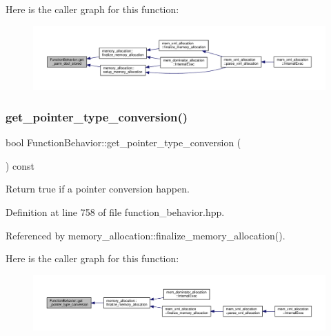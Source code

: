 Here is the caller graph for this function\+:
\nopagebreak
\begin{figure}[H]
\begin{center}
\leavevmode
\includegraphics[width=350pt]{d9/d45/classFunctionBehavior_add32fdf1e32aab5388fb8326ec0d7916_icgraph}
\end{center}
\end{figure}
\mbox{\label{classFunctionBehavior_a4fc3689f912d7f75f7c1340b8338249b}} 
\subsubsection{\texorpdfstring{get\+\_\+pointer\+\_\+type\+\_\+conversion()}{get\_pointer\_type\_conversion()}}
{\footnotesize\ttfamily bool Function\+Behavior\+::get\+\_\+pointer\+\_\+type\+\_\+conversion (\begin{DoxyParamCaption}{ }\end{DoxyParamCaption}) const\hspace{0.3cm}{\ttfamily [inline]}}



Return true if a pointer conversion happen. 



Definition at line 758 of file function\+\_\+behavior.\+hpp.



Referenced by memory\+\_\+allocation\+::finalize\+\_\+memory\+\_\+allocation().

Here is the caller graph for this function\+:
\nopagebreak
\begin{figure}[H]
\begin{center}
\leavevmode
\includegraphics[width=350pt]{d9/d45/classFunctionBehavior_a4fc3689f912d7f75f7c1340b8338249b_icgraph}
\end{center}
\end{figure}
\mbox{\label{classFunctionBehavior_a2083d4c4fbab19a2fa33565cf9fd1486}} 
